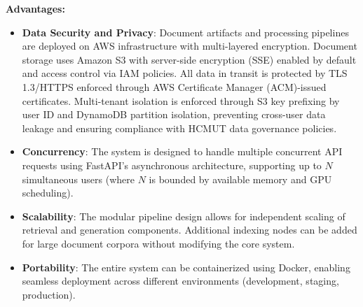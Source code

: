\textbf{Advantages:}
\begin{itemize}
    \item \textbf{Data Security and Privacy}: Document artifacts and processing pipelines are deployed on AWS infrastructure with multi-layered encryption. Document storage uses Amazon S3 with server-side encryption (SSE) enabled by default and access control via IAM policies. All data in transit is protected by TLS 1.3/HTTPS enforced through AWS Certificate Manager (ACM)-issued certificates. Multi-tenant isolation is enforced through S3 key prefixing by user ID and DynamoDB partition isolation, preventing cross-user data leakage and ensuring compliance with HCMUT data governance policies.
    \item \textbf{Concurrency}: The system is designed to handle multiple concurrent API requests using FastAPI's asynchronous architecture, supporting up to $N$ simultaneous users (where $N$ is bounded by available memory and GPU scheduling).
    \item \textbf{Scalability}: The modular pipeline design allows for independent scaling of retrieval and generation components. Additional indexing nodes can be added for large document corpora without modifying the core system.
    \item \textbf{Portability}: The entire system can be containerized using Docker, enabling seamless deployment across different environments (development, staging, production).
\end{itemize}

